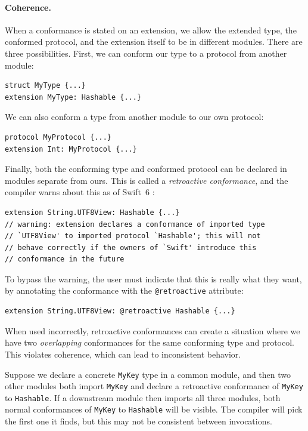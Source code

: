 \documentclass[../generics]{subfiles}
\begin{document}
\paragraph{Coherence.} When a conformance is stated on an extension, we allow the extended type, the conformed protocol, and the extension itself to be in different modules. There are three possibilities. First, we can conform our type to a protocol from another module:
\begin{Verbatim}
struct MyType {...}
extension MyType: Hashable {...}
\end{Verbatim}
We can also conform a type from another module to our own protocol:
\begin{Verbatim}
protocol MyProtocol {...}
extension Int: MyProtocol {...}
\end{Verbatim}
Finally, both the conforming type and conformed protocol can be declared in modules separate from ours. This is called a \emph{retroactive conformance}, and the compiler warns about this as of Swift~6 \cite{se0364}:
\begin{Verbatim}
extension String.UTF8View: Hashable {...}
// warning: extension declares a conformance of imported type
// `UTF8View' to imported protocol `Hashable'; this will not
// behave correctly if the owners of `Swift' introduce this
// conformance in the future
\end{Verbatim}
To bypass the warning, the user must indicate that this is really what they want, by annotating the conformance with the \texttt{@retroactive} attribute:
\begin{Verbatim}
extension String.UTF8View: @retroactive Hashable {...}
\end{Verbatim}
When used incorrectly, retroactive conformances can create a situation where we have two \emph{overlapping} conformances for the same conforming type and protocol. This violates coherence, which can lead to inconsistent behavior.

Suppose we declare a concrete \texttt{MyKey} type in a common module, and then two other modules both import \texttt{MyKey} and declare a retroactive conformance of \texttt{MyKey} to \texttt{Hashable}. If a downstream module then imports all three modules, both normal conformances of \texttt{MyKey} to \texttt{Hashable} will be visible. The compiler will pick the first one it finds, but this may not be consistent between invocations.
\end{document}
